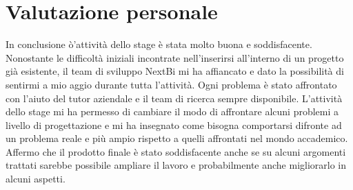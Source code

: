 \section{Valutazione personale}

In conclusione ò'attività dello stage è stata molto buona e soddisfacente. Nonostante le difficoltà iniziali incontrate nell'inserirsi all'interno di un progetto già esistente, il team di sviluppo NextBi mi ha affiancato e dato la possibilità di sentirmi a mio aggio durante tutta l'attività.
Ogni problema è stato affrontato con l'aiuto del tutor aziendale e il team di ricerca sempre disponibile.
L'attività dello stage mi ha permesso di cambiare il modo di affrontare alcuni problemi a livello di progettazione e mi ha insegnato come bisogna comportarsi difronte ad un problema reale e più ampio rispetto a quelli affrontati nel mondo accademico. Affermo che il prodotto finale è stato soddisfacente anche se su alcuni argomenti trattati sarebbe possibile ampliare il lavoro e probabilmente anche migliorarlo in alcuni aspetti.







 